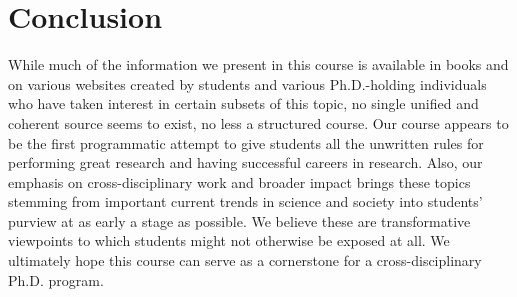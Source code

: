 \section{Conclusion}\label{sec:conclusion}

While much of the information we present in this course is available in
books and on various websites created by students and various
Ph.D.-holding individuals who have taken interest in certain subsets of
this topic, no single unified and coherent source seems to exist, no
less a structured course.  Our course appears to be the first
programmatic attempt to give students all the unwritten rules for
performing great research and having successful careers in research.
Also, our emphasis on cross-disciplinary work and broader impact brings
these topics stemming from important current trends in science and
society into students' purview at as early a stage as possible.  We
believe these are transformative viewpoints to which students might not
otherwise be exposed at all.  We ultimately hope this course can
serve as a cornerstone for a cross-disciplinary Ph.D. program.

